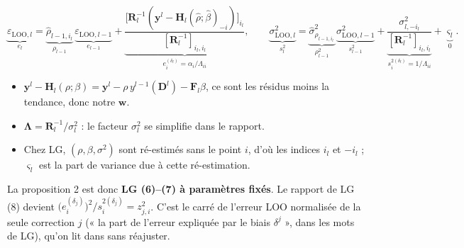 \documentclass[10pt,a4paper]{article}
\newcommand{\vw}{\bm{w}}
\newcommand{\Lam}{\bm{\Lambda}}
\begin{document}
\begin{lgbox}
\[
  \underbrace{\varepsilon_{\mathrm{LOO},l}}_{e_l}=\underbrace{\hat\rho_{l-1,i_l}}_{\rho_{l-1}}\,
  \underbrace{\varepsilon_{\mathrm{LOO},l-1}}_{e_{l-1}}
  +\underbrace{\frac{\big[\mathbf{R}_l^{-1}(\mathbf{y}^l-\mathbf{H}_l(\hat\rho;\hat\beta)_{-i})\big]_{i_l}}
  {[\mathbf{R}_l^{-1}]_{i_l,i_l}}}_{e_i^{(\delta_l)}=\alpha_i/\Lambda_{ii}},
  \qquad
  \underbrace{\sigma^2_{\mathrm{LOO},l}}_{s_l^2}=\underbrace{\hat\sigma^2_{\rho_{l-1,i_l}}}_{\rho_{l-1}^2}\,
  \underbrace{\sigma^2_{\mathrm{LOO},l-1}}_{s_{l-1}^2}
  +\underbrace{\frac{\sigma^2_{l,-i_l}}{[\mathbf{R}_l^{-1}]_{i_l,i_l}}}_{s_i^{2(\delta_l)}=1/\Lambda_{ii}}
  +\underbrace{\varsigma_l}_{0}.
\]
\begin{itemize}
  \item $\mathbf{y}^l-\mathbf{H}_l(\rho;\beta)=\mathbf{y}^l-\rho\,y^{l-1}(\mathbf{D}^l)-\mathbf{F}_l\beta$, ce
        sont les résidus moins la tendance, donc notre $\vw$.
  \item $\Lam=\mathbf{R}_l^{-1}/\sigma_l^2$ : le facteur $\sigma_l^2$ se simplifie dans le rapport.
  \item Chez LG, $(\rho,\beta,\sigma^2)$ sont ré-estimés sans le point $i$, d'où les indices $i_l$ et
        $-i_l$ ; $\varsigma_l$ est la part de variance due à cette ré-estimation.
\end{itemize}
La proposition 2 est donc \textbf{LG (6)–(7) à paramètres fixés}. Le rapport de LG (8) devient
$\big(e_i^{(\delta_j)}\big)^2/s_i^{2(\delta_j)}=z^2_{j,i}$. C'est le carré de l'erreur LOO normalisée de la
seule correction $j$ (« la part de l'erreur expliquée par le biais $\delta^j$ », dans les mots de LG), qu'on
lit dans  sans réajuster.
\end{lgbox}

\end{document}
